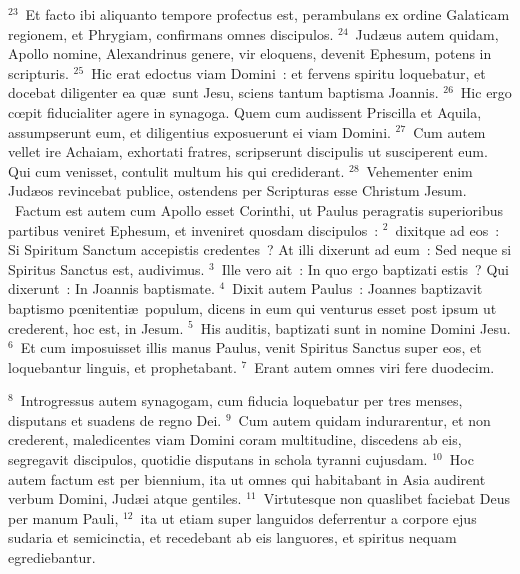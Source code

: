 ${}^{23}$~Et facto ibi aliquanto tempore profectus est, perambulans ex ordine Galaticam regionem, et Phrygiam, confirmans omnes discipulos.
${}^{24}$~Jud\ae us autem quidam, Apollo nomine, Alexandrinus genere, vir eloquens, devenit Ephesum, potens in scripturis.
${}^{25}$~Hic erat edoctus viam Domini~: et fervens spiritu loquebatur, et docebat diligenter ea qu\ae\ sunt Jesu, sciens tantum baptisma Joannis.
${}^{26}$~Hic ergo cœpit fiducialiter agere in synagoga. Quem cum audissent Priscilla et Aquila, assumpserunt eum, et diligentius exposuerunt ei viam Domini.
${}^{27}$~Cum autem vellet ire Achaiam, exhortati fratres, scripserunt discipulis ut susciperent eum. Qui cum venisset, contulit multum his qui crediderant.
${}^{28}$~Vehementer enim Jud\ae os revincebat publice, ostendens per Scripturas esse Christum Jesum.
~\lettrine[lines=10,image=true,loversize=0.05,lraise=-0.03]{F}{}actum est autem cum Apollo esset Corinthi, ut Paulus peragratis superioribus partibus veniret Ephesum, et inveniret quosdam discipulos~:
${}^{2}$~dixitque ad eos~: Si Spiritum Sanctum accepistis credentes~? At illi dixerunt ad eum~: Sed neque si Spiritus Sanctus est, audivimus.
${}^{3}$~Ille vero ait~: In quo ergo baptizati estis~? Qui dixerunt~: In Joannis baptismate.
${}^{4}$~Dixit autem Paulus~: Joannes baptizavit baptismo pœnitenti\ae\ populum, dicens in eum qui venturus esset post ipsum ut crederent, hoc est, in Jesum.
${}^{5}$~His auditis, baptizati sunt in nomine Domini Jesu.
${}^{6}$~Et cum imposuisset illis manus Paulus, venit Spiritus Sanctus super eos, et loquebantur linguis, et prophetabant.
${}^{7}$~Erant autem omnes viri fere duodecim.


${}^{8}$~Introgressus autem synagogam, cum fiducia loquebatur per tres menses, disputans et suadens de regno Dei.
${}^{9}$~Cum autem quidam indurarentur, et non crederent, maledicentes viam Domini coram multitudine, discedens ab eis, segregavit discipulos, quotidie disputans in schola tyranni cujusdam.
${}^{10}$~Hoc autem factum est per biennium, ita ut omnes qui habitabant in Asia audirent verbum Domini, Jud\ae i atque gentiles.
${}^{11}$~Virtutesque non quaslibet faciebat Deus per manum Pauli,
${}^{12}$~ita ut etiam super languidos deferrentur a corpore ejus sudaria et semicinctia, et recedebant ab eis languores, et spiritus nequam egrediebantur.


